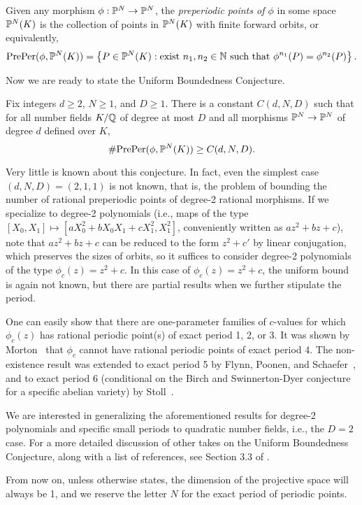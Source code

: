 \begin{definition}
  Given any morphism $\phi: \P^N \to \P^N$, the \emph{preperiodic
    points of $\phi$} in some space $\P^N(K)$ is the collection of
  points in $\P^N(K)$ with finite forward orbits, or equivalently,
  \[
  \preper(\phi, \P^N(K)) = \set{P \in \P^N(K) : \text{exist $n_1, n_2
      \in \N$ such that $\phi^{n_1}(P) = \phi^{n_2}(P)$}}.
  \]
\end{definition}

Now we are ready to state the Uniform Boundedness Conjecture.

\begin{conjecture}
  Fix integers $d \ge 2$, $N \ge 1$, and $D \ge 1$. There is a
  constant $C(d, N, D)$ such that for all number fields $K/\Q$ of
  degree at most $D$ and all morphisms $\P^N \to \P^N$ of degree $d$
  defined over $K$,
  \[
  \#\preper(\phi, \P^N(K)) \ge C(d, N, D).
  \]
\end{conjecture}

Very little is known about this conjecture. In fact, even the simplest
case $(d, N, D) = (2, 1, 1)$ is not known, that is, the problem of
bounding the number of rational preperiodic points of degree-2
rational morphisms. If we specialize to degree-2 polynomials (i.e.,
maps of the type $[X_0, X_1] \mapsto [a X_0^2 + b X_0 X_1 + c X_1^2,
X_1^2]$, conveniently written as $a z^2 + b z + c$), note that $a z^2
+ b z + c$ can be reduced to the form $z^2 + c'$ by linear
conjugation, which preserves the sizes of orbits, so it suffices to
consider degree-2 polynomials of the type $\phi_c(z) = z^2 + c$. In
this case of $\phi_c(z) = z^2 + c$, the uniform bound is again not
known, but there are partial results when we further stipulate the
period.

One can easily show that there are one-parameter families of
$c$-values for which $\phi_c(z)$ has rational periodic point(s) of
exact period 1, 2, or 3. It was shown by Morton~\cite{MR1665198} that
$\phi_c$ cannot have rational periodic points of exact period 4. The
non-existence result was extended to exact period 5 by Flynn, Poonen,
and Schaefer~\cite{MR1480542}, and to exact period 6 (conditional on
the Birch and Swinnerton-Dyer conjecture for a specific abelian
variety) by Stoll~\cite{MR2465796}.

We are interested in generalizing the aforementioned results for
degree-2 polynomials and specific small periods to quadratic number
fields, i.e., the $D = 2$ case. For a more detailed discussion of
other takes on the Uniform Boundedness Conjecture, along with a list
of references, see Section 3.3 of \cite{MR2316407}.

From now on, unless otherwise states, the dimension of the projective
space will always be 1, and we reserve the letter $N$ for the exact
period of periodic points.

